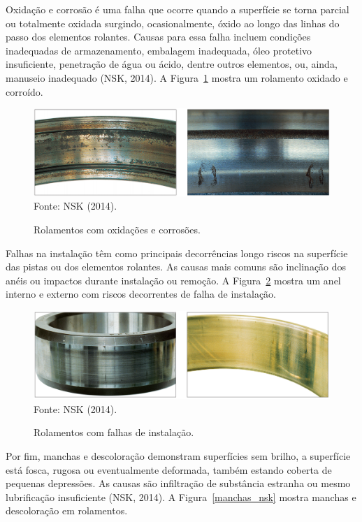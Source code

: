 \documentclass[
	12pt,				
	oneside,			
	a4paper,			
	english,			
	brazil,			
	]{abntex2ppgsi}
\begin{document}
Oxidação e corrosão é uma falha que ocorre quando a superfície se torna parcial ou totalmente oxidada surgindo, ocasionalmente, óxido ao longo das linhas do passo dos elementos rolantes. Causas para essa falha incluem condições inadequadas de armazenamento, embalagem inadequada, óleo protetivo insuficiente, penetração de água ou ácido, dentre outros elementos, ou, ainda, manuseio inadequado (NSK, 2014). A Figura~\ref{oxidacao_nsk} mostra um rolamento oxidado e corroído.

\begin{figure}[H]
\centering
\caption {Rolamentos com oxidações e corrosões.}
\includegraphics[width=\textwidth,height=\textheight,keepaspectratio]{oxidacao_nsk} \\
Fonte: NSK (2014).
\label{oxidacao_nsk}
\end{figure}

Falhas na instalação têm como principais decorrências longo riscos na superfície das pistas ou dos elementos rolantes. As causas mais comuns são inclinação dos anéis ou impactos durante instalação ou remoção. A Figura~\ref{falha_instalacao_nsk} mostra um anel interno e externo com riscos decorrentes de falha de instalação.

\begin{figure}[H]
\centering
\caption {Rolamentos com falhas de instalação.}
\includegraphics[width=\textwidth,height=\textheight,keepaspectratio]{falha_instalacao_nsk} \\
Fonte: NSK (2014).
\label{falha_instalacao_nsk}
\end{figure}

Por fim, manchas e descoloração demonstram superfícies sem brilho, a superfície está fosca, rugosa ou eventualmente deformada, também estando coberta de pequenas depressões. As causas são infiltração de substância estranha ou mesmo lubrificação insuficiente (NSK, 2014). A Figura~\ref{manchas_nsk} mostra manchas e descoloração em rolamentos.
\end{document}
